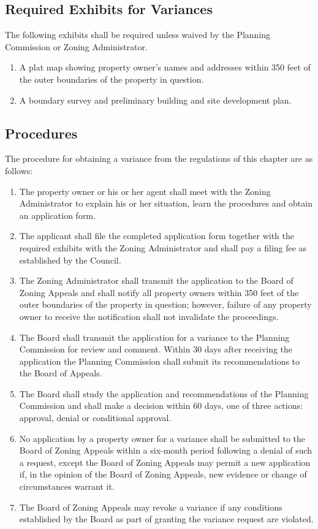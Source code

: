 \subsection{Required Exhibits for Variances}
The following exhibits shall be required unless waived by the Planning Commission or Zoning Administrator.
\begin{enumerate}[{\indent}1)]
    \item A plat map showing property owner’s names and addresses within 350 feet of the outer boundaries of the property in question.
    \item A boundary survey and preliminary building and site development plan.
\end{enumerate}
\subsection{Procedures}
The procedure for obtaining a variance from the regulations of this chapter are as follows:
\begin{enumerate}[{\indent}1)]
    \item The property owner or his or her agent shall meet with the Zoning Administrator to explain his or her situation, learn the procedures and obtain an application form.
    \item The applicant shall file the completed application form together with the required exhibits with the Zoning Administrator and shall pay a filing fee as established by the Council.
    \item The Zoning Administrator shall transmit the application to the Board of Zoning Appeals and shall notify all property owners within 350 feet of the outer boundaries of the property in question; however, failure of any property owner to receive the notification shall not invalidate the proceedings.
    \item The Board shall transmit the application for a variance to the Planning Commission for review and comment. Within 30 days after receiving the application the Planning Commission shall submit its recommendations to the Board of Appeals.
    \item The Board shall study the application and recommendations of the Planning Commission and shall make a decision within 60 days, one of three actions: approval, denial or conditional approval.
    \item No application by a property owner for a variance shall be submitted to the Board of Zoning Appeals within a six-month period following a denial of such a request, except the Board of Zoning Appeals may permit a new application if, in the opinion of the Board of Zoning Appeals, new evidence or change of circumstances warrant it.
    \item The Board of Zoning Appeals may revoke a variance if any conditions established by the Board as part of granting the variance request are violated.
\end{enumerate}

